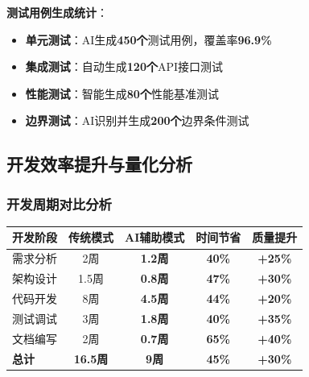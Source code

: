 \documentclass[12pt,a4paper]{article}
\begin{document}
\textbf{测试用例生成统计}：
\begin{itemize}
    \item \textbf{单元测试}：AI生成\textcolor{primary}{\textbf{450个}}测试用例，覆盖率\textcolor{success}{\textbf{96.9\%}}
    \item \textbf{集成测试}：自动生成\textcolor{primary}{\textbf{120个}}API接口测试
    \item \textbf{性能测试}：智能生成\textcolor{primary}{\textbf{80个}}性能基准测试
    \item \textbf{边界测试}：AI识别并生成\textcolor{primary}{\textbf{200个}}边界条件测试
\end{itemize}

\subsection{开发效率提升与量化分析}

\subsubsection{开发周期对比分析}

\begin{table}[H]
\centering
\begin{tcolorbox}[
    colback=light,
    colframe=warning,
    title={\textbf{传统开发 vs AI辅助开发效率对比}},
    coltitle=white,
    colbacktitle=warning,
    fonttitle=\bfseries,
    rounded corners=5pt,
    width=0.95\textwidth
]
\begin{tabular}{lcccc}
\toprule
\rowcolor{warning!20}
\textbf{开发阶段} & \textbf{传统模式} & \textbf{AI辅助模式} & \textbf{时间节省} & \textbf{质量提升} \\
\midrule
需求分析 & 2周 & \textcolor{success}{\textbf{1.2周}} & \textcolor{success}{\textbf{40\%}} & \textcolor{success}{\textbf{+25\%}} \\
\rowcolor{light}
架构设计 & 1.5周 & \textcolor{success}{\textbf{0.8周}} & \textcolor{success}{\textbf{47\%}} & \textcolor{success}{\textbf{+30\%}} \\
代码开发 & 8周 & \textcolor{success}{\textbf{4.5周}} & \textcolor{success}{\textbf{44\%}} & \textcolor{success}{\textbf{+20\%}} \\
\rowcolor{light}
测试调试 & 3周 & \textcolor{success}{\textbf{1.8周}} & \textcolor{success}{\textbf{40\%}} & \textcolor{success}{\textbf{+35\%}} \\
文档编写 & 2周 & \textcolor{success}{\textbf{0.7周}} & \textcolor{success}{\textbf{65\%}} & \textcolor{success}{\textbf{+40\%}} \\
\midrule
\rowcolor{accent!20}
\textbf{总计} & \textbf{16.5周} & \textcolor{success}{\textbf{9周}} & \textcolor{success}{\textbf{45\%}} & \textcolor{success}{\textbf{+30\%}} \\
\bottomrule
\end{tabular}
\end{tcolorbox}
\end{table}
\end{document}
